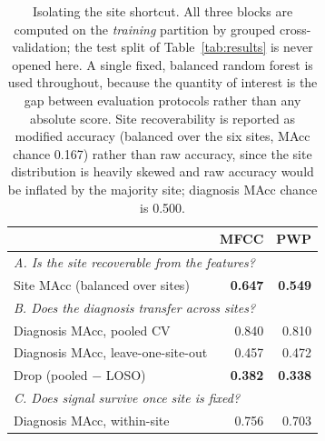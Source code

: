 \begin{table}[t]
\centering
\caption{Isolating the site shortcut. All three blocks are computed on the
\emph{training} partition by grouped cross-validation; the test split of
Table~\ref{tab:results} is never opened here. A single fixed, balanced random
forest is used throughout, because the quantity of interest is the gap between
evaluation protocols rather than any absolute score. Site recoverability is
reported as modified accuracy (balanced over the six sites, MAcc chance
\num{0.167}) rather than raw accuracy, since the site distribution is heavily
skewed and raw accuracy would be inflated by the majority site; diagnosis MAcc
chance is \num{0.500}.}
\label{tab:siteshortcut}
\begin{tabular}{lrr}
\toprule
 & MFCC & PWP \\
\midrule
\multicolumn{3}{l}{\emph{A. Is the site recoverable from the features?}}\\
\quad Site MAcc (balanced over sites) & \textbf{0.647} & \textbf{0.549} \\
\midrule
\multicolumn{3}{l}{\emph{B. Does the diagnosis transfer across sites?}}\\
\quad Diagnosis MAcc, pooled CV          & 0.840 & 0.810 \\
\quad Diagnosis MAcc, leave-one-site-out & 0.457 & 0.472 \\
\quad Drop (pooled $-$ LOSO)             & \textbf{0.382} & \textbf{0.338} \\
\midrule
\multicolumn{3}{l}{\emph{C. Does signal survive once site is fixed?}}\\
\quad Diagnosis MAcc, within-site & 0.756 & 0.703 \\
\bottomrule
\end{tabular}
\end{table}
